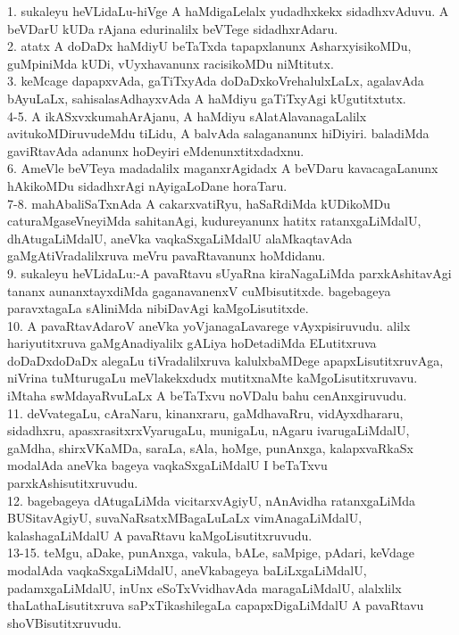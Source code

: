 \documentclass{article}
\begin{document}
1. sukaleyu heVLidaLu-hiVge A haMdigaLelalx yudadhxkekx sidadhxvAduvu. A beVDarU kUDa rAjana edurinalilx beVTege sidadhxrAdaru.\\
2. atatx A doDaDx haMdiyU beTaTxda tapapxlanunx AsharxyisikoMDu, guMpiniMda kUDi, vUyxhavanunx racisikoMDu niMtitutx.\\
3. keMcage dapapxvAda, gaTiTxyAda doDaDxkoVrehalulxLaLx, agalavAda bAyuLaLx, sahisalasAdhayxvAda A haMdiyu gaTiTxyAgi kUgutitxtutx.\\
4-5. A ikASxvxkumahArAjanu, A haMdiyu sAlatAlavanagaLalilx avitukoMDiruvudeMdu tiLidu, A balvAda salagananunx hiDiyiri. baladiMda gaviRtavAda adanunx hoDeyiri eMdenunxtitxdadxnu.\\
6. AmeVle beVTeya madadalilx maganxrAgidadx A beVDaru kavacagaLanunx hAkikoMDu sidadhxrAgi nAyigaLoDane horaTaru.\\
7-8. mahAbaliSaTxnAda A cakarxvatiRyu, haSaRdiMda kUDikoMDu caturaMgaseVneyiMda sahitanAgi, kudureyanunx hatitx ratanxgaLiMdalU, dhAtugaLiMdalU, aneVka vaqkaSxgaLiMdalU alaMkaqtavAda gaMgAtiVradalilxruva meVru pavaRtavanunx hoMdidanu.\\
9. sukaleyu heVLidaLu:-A pavaRtavu sUyaRna kiraNagaLiMda parxkAshitavAgi tananx aunanxtayxdiMda gaganavanenxV cuMbisutitxde. bagebageya paravxtagaLa sAliniMda nibiDavAgi kaMgoLisutitxde.\\
10. A pavaRtavAdaroV aneVka yoVjanagaLavarege vAyxpisiruvudu. alilx hariyutitxruva gaMgAnadiyalilx gALiya hoDetadiMda ELutitxruva doDaDxdoDaDx alegaLu tiVradalilxruva kalulxbaMDege apapxLisutitxruvAga, niVrina tuMturugaLu meVlakekxdudx mutitxnaMte kaMgoLisutitxruvavu. iMtaha swMdayaRvuLaLx A beTaTxvu noVDalu bahu cenAnxgiruvudu.\\
11. deVvategaLu, cAraNaru, kinanxraru, gaMdhavaRru, vidAyxdhararu, sidadhxru, apasxrasitxrxVyarugaLu, munigaLu, nAgaru ivarugaLiMdalU, gaMdha, shirxVKaMDa, saraLa, sAla, hoMge, punAnxga, kalapxvaRkaSx modalAda aneVka bageya vaqkaSxgaLiMdalU I beTaTxvu parxkAshisutitxruvudu.\\
12. bagebageya dAtugaLiMda vicitarxvAgiyU, nAnAvidha ratanxgaLiMda BUSitavAgiyU, suvaNaRsatxMBagaLuLaLx vimAnagaLiMdalU, kalashagaLiMdalU A pavaRtavu kaMgoLisutitxruvudu.\\
13-15. teMgu, aDake, punAnxga, vakula, bALe, saMpige, pAdari, keVdage modalAda vaqkaSxgaLiMdalU, aneVkabageya baLiLxgaLiMdalU, padamxgaLiMdalU, inUnx eSoTxVvidhavAda maragaLiMdalU, alalxlilx thaLathaLisutitxruva saPxTikashilegaLa capapxDigaLiMdalU A pavaRtavu shoVBisutitxruvudu.\\
\end{document}
